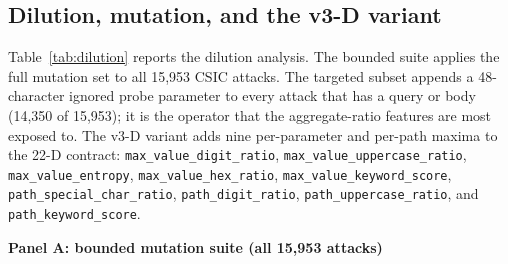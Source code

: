 \documentclass[preprint,11pt]{elsarticle}
\begin{document}
\subsection{Dilution, mutation, and the v3-D
variant}\label{dilution-mutation-and-the-v3-d-variant}

Table~\ref{tab:dilution} reports the dilution analysis. The bounded suite applies the
full mutation set to all 15,953 CSIC attacks. The targeted subset
appends a 48-character ignored probe parameter to every attack that has
a query or body (14,350 of 15,953); it is the operator that the
aggregate-ratio features are most exposed to. The v3-D variant adds nine
per-parameter and per-path maxima to the 22-D contract:
\texttt{max\_\allowbreak{}value\_\allowbreak{}digit\_\allowbreak{}ratio},
\texttt{max\_\allowbreak{}value\_\allowbreak{}uppercase\_\allowbreak{}ratio}, \texttt{max\_\allowbreak{}value\_\allowbreak{}entropy},
\texttt{max\_\allowbreak{}value\_\allowbreak{}hex\_\allowbreak{}ratio}, \texttt{max\_\allowbreak{}value\_\allowbreak{}keyword\_\allowbreak{}score},
\texttt{path\_\allowbreak{}special\_\allowbreak{}char\_\allowbreak{}ratio}, \texttt{path\_\allowbreak{}digit\_\allowbreak{}ratio},
\texttt{path\_\allowbreak{}uppercase\_\allowbreak{}ratio}, and \texttt{path\_\allowbreak{}keyword\_\allowbreak{}score}.



\textbf{Panel A: bounded mutation suite (all 15,953 attacks)}
\end{document}
